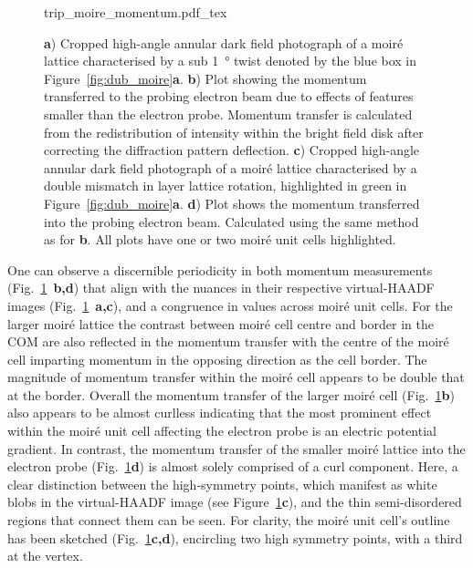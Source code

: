 %
\begin{figure}[ht]
    \centering
    \def\svgwidth{.7\linewidth}
    {trip_moire_momentum.pdf_tex}
    \caption{\textbf{a}) Cropped high-angle annular dark field photograph of a moiré lattice characterised by a sub \SI{1}{\degree} twist denoted by the blue box in Figure~\ref{fig:dub_moire}\textbf{a}. \textbf{b}) Plot showing the momentum transferred to the probing electron beam due to effects of features smaller than the electron probe. Momentum transfer is calculated from the redistribution of intensity within the bright field disk after correcting the diffraction pattern deflection. \textbf{c}) Cropped high-angle annular dark field photograph of a moiré lattice characterised by a double mismatch in layer lattice rotation, highlighted in green in Figure~\ref{fig:dub_moire}\textbf{a}. \textbf{d}) Plot shows the momentum transferred into the probing electron beam. Calculated using the same method as for \textbf{b}. All plots have one or two moiré unit cells highlighted.}
    \label{fig:trip_m_mom}
\end{figure}
%
One can observe a discernible periodicity in both momentum measurements (Fig.~\ref{fig:trip_m_mom}~\textbf{b,d}) that align with the nuances in their respective virtual-HAADF images (Fig.~\ref{fig:trip_m_mom}~\textbf{a,c}), and a congruence in values across moiré unit cells. 
%
For the larger moiré lattice the contrast between moiré cell centre and border in the COM are also reflected in the momentum transfer with the centre of the moiré cell imparting momentum in the opposing direction as the cell border. The magnitude of momentum transfer within the moiré cell appears to be double that at the border.
%
Overall the momentum transfer of the larger moiré cell (Fig.~\ref{fig:trip_m_mom}\textbf{b}) also appears to be almost curlless indicating that the most prominent effect within the moiré unit cell affecting the electron probe is an electric potential gradient.
%
In contrast, the momentum transfer of the smaller moiré lattice into the electron probe (Fig.~\ref{fig:trip_m_mom}\textbf{d}) is almost solely comprised of a curl component.
%
Here, a clear distinction between the high-symmetry points, which manifest as white blobs in the virtual-HAADF image (see Figure~\ref{fig:trip_m_mom}\textbf{c}), and the thin semi-disordered regions that connect them can be seen.
%
For clarity, the moiré unit cell's outline has been sketched (Fig.~\ref{fig:trip_m_mom}\textbf{c,d}), encircling two high symmetry points, with a third at the vertex. 
